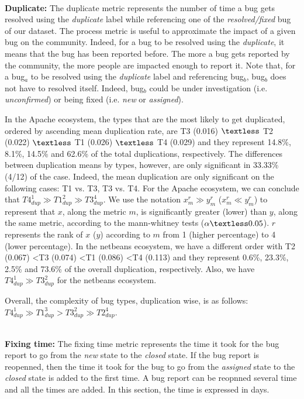 \\ \vspace{0.1cm} {\bf Duplicate: }
The duplicate metric represents the number of time a bug gets resolved using the {\it duplicate} label while referencing one of the {\it resolved/fixed} bug of our dataset.
The process metric is useful to approximate the impact of a given bug on the community.
Indeed, for a bug to be resolved using the {\it duplicate}, it means that the bug has been reported before.
The more a bug gets reported by the community, the more people are impacted enough to report it.
Note that, for a bug$_a$ to be resolved using the {\it duplicate} label and referencing bug$_b$, bug$_b$ does not have to resolved itself.
Indeed, bug$_b$ could be under investigation (i.e. {\it unconfirmed}) or being fixed (i.e. {\it new} or {\it assigned}).

In the Apache ecosystem, the types that are the most likely to get duplicated, ordered by ascending mean duplication rate, are T3 (0.016) $\textless$ T2 (0.022) $\textless$ T1 (0.026) $\textless$ T4 (0.029) and they represent 14.8\%, 8.1\%, 14.5\% and 62.6\% of the total duplications, respectively.
The differences between duplication means by types, however, are only significant in 33.33\% (4/12) of the case.
Indeed, the mean duplication are only significant on the following cases: T1 vs. T3, T3 vs. T4.
For the Apache ecosystem, we can conclude that $T4_{dup}^1 \gg T1_{dup}^2 \gg T3_{dup}^4$.
We use the notation  $x_{m}^r \gg y_{m}^r$ ($x_{m}^r \ll y_{m}^r$) to represent that $x$, along the metric $m$, is significantly greater (lower) than $y$, along the same metric, according to the mann-whitney tests ($\alpha \textless 0.05$).
$r$ represents the rank of $x$ ($y$) according to $m$ from 1 (higher percentage) to 4 (lower percentage).
In the netbeans ecosystem, we have a different order with T2 (0.067) \textless T3 (0.074) \textless T1 (0.086) \textless T4 (0.113) and they represent 0.6\%, 23.3\%, 2.5\% and 73.6\% of the overall duplication, respectively. Also, we have $T4_{dup}^1 \gg T3_{dup}^2$ for the netbeans ecosystem.

Overall, the complexity of bug types, duplication wise, is as follows:  $T4_{dup}^{1} \gg T1_{dup}^{3} > T3_{dup}^{2} \gg T2_{dup}^{4}$.


\\ \vspace{0.1cm} {\bf Fixing time: } The fixing time metric represents the time it took for the bug report to go from the {\it new} state to the {\it closed} state.
If the bug report is reopenned, then the time it took for the bug to go from the {\it assigned} state to the {\it closed} state is added to the first time.
A bug report can be reopnned several time and all the times are added.
In this section, the time is expressed in days.

